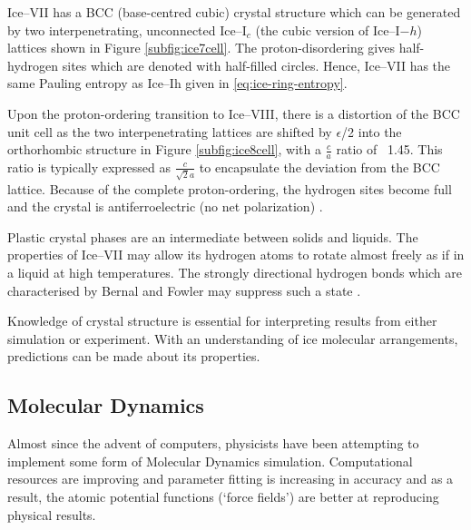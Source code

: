 \par
Ice--VII has a BCC (base-centred cubic) crystal structure which can be generated by
two interpenetrating, unconnected Ice--I$_c$ (the cubic version of Ice--I$-h$) lattices shown in Figure
\ref{subfig:ice7cell}.
The proton-disordering gives half-hydrogen sites which are denoted with half-filled circles.
Hence, Ice--VII has the same Pauling entropy as Ice--Ih given in \ref{eq:ice-ring-entropy}.

\par
Upon the proton-ordering transition to Ice--VIII, there is a distortion of the BCC unit cell as the
two interpenetrating lattices are shifted by $\epsilon$/2 into the orthorhombic structure in 
Figure \ref{subfig:ice8cell}, with a $\frac{c}{a}$ ratio of ~1.45.
This ratio is typically expressed as $\frac{c}{\sqrt{2}a}$ to encapsulate the deviation from
the BCC lattice.
Because of the complete proton-ordering, the hydrogen sites become full and the crystal is 
antiferroelectric (no net polarization) \cite{petrenko2002}.

\par
Plastic crystal phases are an intermediate between solids and liquids.
The properties of Ice--VII may allow its hydrogen atoms to rotate almost freely as if in a liquid at 
high temperatures.
The strongly directional hydrogen bonds which are characterised by Bernal and Fowler may suppress
such a state \cite{rescigno2025}.

\par
Knowledge of crystal structure is essential for interpreting results from either simulation or experiment.
With an understanding of ice molecular arrangements, predictions can be made about its properties.

\subsection{Molecular Dynamics}
Almost since the advent of computers, physicists have been attempting to implement some form of Molecular
Dynamics simulation.
Computational resources are improving and parameter fitting is
increasing in accuracy and as a result, the atomic potential functions (`force fields') are better at reproducing
physical results.

